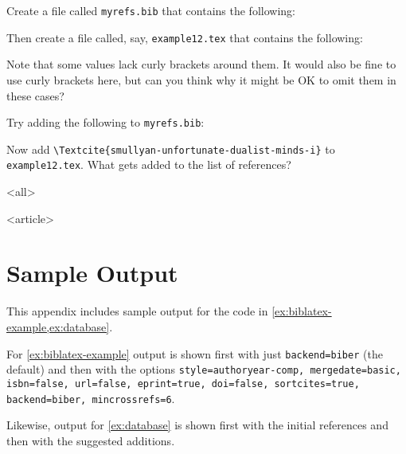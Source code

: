 \begin{exercise}\label{ex:database}
  Create a file called \texttt{myrefs.bib} that contains the following: 

  Then create a file called, say, \texttt{example12.tex} that contains the following: 
  
  Note that some values lack curly brackets around them.
  It would also be fine to use curly brackets here, but can you think why it might be OK to omit them in these cases?

  Try adding the following to \texttt{myrefs.bib}:
  

  Now add \verb|\Textcite{smullyan-unfortunate-dualist-minds-i}| to \texttt{example12.tex}.
  What gets added to the list of references?

\end{exercise}

\mode
<all>


\mode
<article>


\appendix\label{app}
\section<1-| beamer:0>{Sample Output}\label{sec:samples}

This appendix includes sample output for the code in \cref{ex:biblatex-example,ex:database}.

For \cref{ex:biblatex-example} output is shown first with just \texttt{backend=biber} (the default) and then with the options \texttt{style=authoryear-comp, mergedate=basic, isbn=false, url=false, eprint=true, doi=false, sortcites=true, backend=biber, mincrossrefs=6}.

Likewise, output for \cref{ex:database} is shown first with the initial references and then with the suggested additions.

